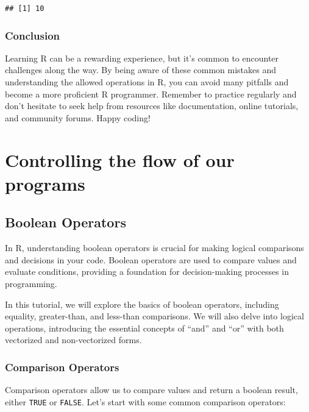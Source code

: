 \documentclass[
]{book}
\begin{document}
\begin{verbatim}
## [1] 10
\end{verbatim}

\hypertarget{conclusion-4}{%
\subsection{Conclusion}\label{conclusion-4}}

Learning R can be a rewarding experience, but it's common to encounter challenges along the way. By being aware of these common mistakes and understanding the allowed operations in R, you can avoid many pitfalls and become a more proficient R programmer. Remember to practice regularly and don't hesitate to seek help from resources like documentation, online tutorials, and community forums. Happy coding!

\hypertarget{controlling-the-flow-of-our-programs}{%
\chapter{Controlling the flow of our programs}\label{controlling-the-flow-of-our-programs}}

\hypertarget{boolean-operators}{%
\section{Boolean Operators}\label{boolean-operators}}

In R, understanding boolean operators is crucial for making logical comparisons and decisions in your code. Boolean operators are used to compare values and evaluate conditions, providing a foundation for decision-making processes in programming.

In this tutorial, we will explore the basics of boolean operators, including equality, greater-than, and less-than comparisons. We will also delve into logical operations, introducing the essential concepts of ``and'' and ``or'' with both vectorized and non-vectorized forms.

\hypertarget{comparison-operators}{%
\subsection{Comparison Operators}\label{comparison-operators}}

Comparison operators allow us to compare values and return a boolean result, either \texttt{TRUE} or \texttt{FALSE}. Let's start with some common comparison operators:
\end{document}
